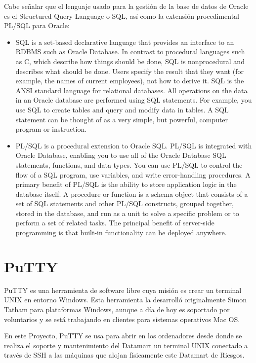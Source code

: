\documentclass[a4paper, 12pt]{book}
\begin{document}
Cabe señalar que el lenguaje usado para la gestión de la base de datos de Oracle es el Structured Query Language o SQL, así como la extensión procedimental PL/SQL para Oracle:

\begin{itemize}
	\item SQL is a set-based declarative language that provides an interface to an RDBMS such as Oracle Database. In contrast to procedural languages such as C, which describe how things should be done, SQL is nonprocedural and describes what should be done. Users specify the result that they want (for example, the names of current employees), not how to derive it. SQL is the ANSI standard language for relational databases.
All operations on the data in an Oracle database are performed using SQL statements. For example, you use SQL to create tables and query and modify data in tables. A SQL statement can be thought of as a very simple, but powerful, computer program or instruction.

	\item PL/SQL is a procedural extension to Oracle SQL. PL/SQL is integrated with Oracle Database, enabling you to use all of the Oracle Database SQL statements, functions, and data types. You can use PL/SQL to control the flow of a SQL program, use variables, and write error-handling procedures.
A primary benefit of PL/SQL is the ability to store application logic in the database itself. A procedure or function is a schema object that consists of a set of SQL statements and other PL/SQL constructs, grouped together, stored in the database, and run as a unit to solve a specific problem or to perform a set of related tasks. The principal benefit of server-side programming is that built-in functionality can be deployed anywhere.
\end{itemize}

\section{PuTTY}
\label{sec:PuTTY}
PuTTY es una herramienta de software libre cuya misión es crear un terminal UNIX en entorno Windows. Esta herramienta la desarrolló originalmente Simon Tatham para plataformas Windows, aunque a día de hoy es soportado por voluntarios y se está trabajando en clientes para sistemas operativos Mac OS.

En este Proyecto, PuTTY se usa para abrir en los ordenadores desde donde se realiza el soporte y mantenimiento del Datamart un terminal UNIX conectado a través de SSH a las máquinas que alojan físicamente este Datamart de Riesgos.
\end{document}
